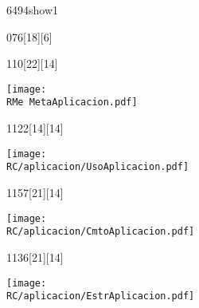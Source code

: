 \begin{NuevaPagina}{64}{94}{show1}
	\CabeceraDePoster{\MATERIA} 
	\begin{NuevoParrafo}{0}{76}[18][6]
		\begin{Marco}[\LineaSupC][\LineaInfC][\LineaIzqC][\LineaDerC][CBlanco]
		\end{Marco}
	\end{NuevoParrafo} 
	\CiudadFechaVolumen
	\begin{NuevoParrafo}{11}{0}[22][14]
		\begin{Marco}[\LineaSupC][\LineaInfC][\LineaIzqC][\LineaDerC][CBlanco]
			\centering\texttt{[image: \\RMe MetaAplicacion.pdf]}		
		\end{Marco}
	\end{NuevoParrafo}	
	\begin{NuevoParrafo}{11}{22}[14][14]
		\begin{Marco}[\LineaSupC][\LineaInfC][\LineaIzqC][\LineaDerC][CBlanco]
			\subseccionC{\PVUAp}%
			\centering\texttt{[image: \\RC/aplicacion/UsoAplicacion.pdf]}		
		\end{Marco}
	\end{NuevoParrafo}	
	
	\begin{NuevoParrafo}{11}{57}[21][14]
		\begin{Marco}[\LineaSupC][\LineaInfC][\LineaIzqC][\LineaDerC][CBlanco]
			\subseccionC{\PVCMA}%
			\centering\texttt{[image: \\RC/aplicacion/CmtoAplicacion.pdf]}		
		\end{Marco}
	\end{NuevoParrafo}	
	\begin{NuevoParrafo}{11}{36}[21][14]
		\begin{Marco}[\LineaSupC][\LineaInfC][\LineaIzqC][\LineaDerC][CBlanco]			
		\subseccionC{\PVEAp}%
		\centering\texttt{[image: \\RC/aplicacion/EstrAplicacion.pdf]}		
		\end{Marco}
	\end{NuevoParrafo}	
	

\end{NuevaPagina}

